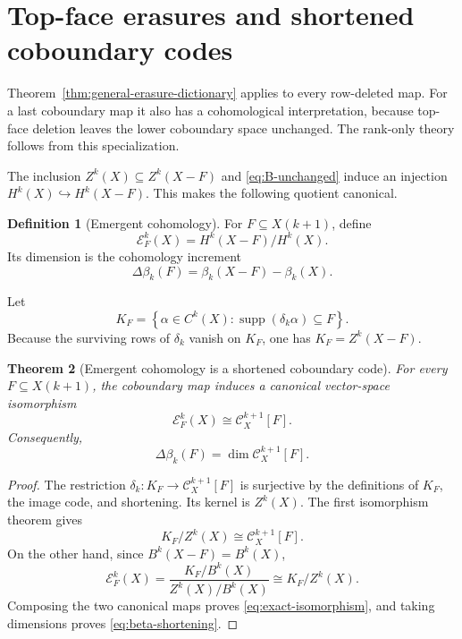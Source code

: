 \documentclass[11pt,letterpaper]{article}
\theoremstyle{plain}
\newtheorem{theorem}{Theorem}[section]
\theoremstyle{definition}
\newtheorem{definition}[theorem]{Definition}
\newcommand{\cC}{\mathcal{C}}
\newcommand{\cE}{\mathcal{E}}
\newcommand{\supp}{\operatorname{supp}}
\newcommand{\1}{\mathbf{1}}
\newcommand{\set}[1]{\left\{#1\right\}}
\begin{document}
\section{Top-face erasures and shortened coboundary codes}\label{sec:exact}

Theorem~\ref{thm:general-erasure-dictionary} applies to every row-deleted
map.  For a last coboundary map it also has a cohomological interpretation,
because top-face deletion leaves the lower coboundary space unchanged.  The
rank-only theory follows from this specialization.


The inclusion $Z^k(X)\subseteq Z^k(X-F)$ and
\eqref{eq:B-unchanged} induce an injection $H^k(X)\hookrightarrow H^k(X-F)$.
This makes the following quotient canonical.

\begin{definition}[Emergent cohomology]\label{def:emergent}
For $F\subseteq X(k+1)$, define
\[
 \cE_F^k(X)=H^k(X-F)/H^k(X).
\]
Its dimension is the cohomology increment
\[
 \Delta\beta_k(F)=\beta_k(X-F)-\beta_k(X).
\]
\end{definition}

Let
\[
 K_F=\set{\alpha\in C^k(X):\supp(\delta_k\alpha)\subseteq F}.
\]
Because the surviving rows of $\delta_k$ vanish on $K_F$, one has
$K_F=Z^k(X-F)$.

\begin{theorem}[Emergent cohomology is a shortened coboundary code]
\label{thm:exact-isomorphism}
For every $F\subseteq X(k+1)$, the coboundary map induces a canonical vector-space
isomorphism
\begin{equation}\label{eq:exact-isomorphism}
 \cE_F^k(X)\cong \cC_X^{k+1}[F].
\end{equation}
Consequently,
\begin{equation}\label{eq:beta-shortening}
 \Delta\beta_k(F)=\dim\cC_X^{k+1}[F].
\end{equation}
\end{theorem}

\begin{proof}
The restriction $\delta_k:K_F\to\cC_X^{k+1}[F]$ is surjective by the definitions of
$K_F$, the image code, and shortening.  Its kernel is $Z^k(X)$.  The first isomorphism theorem gives
\[
 K_F/Z^k(X)\cong \cC_X^{k+1}[F].
\]
On the other hand, since $B^k(X-F)=B^k(X)$,
\[
 \cE_F^k(X)
 =\frac{K_F/B^k(X)}{Z^k(X)/B^k(X)}
 \cong K_F/Z^k(X).
\]
Composing the two canonical maps proves \eqref{eq:exact-isomorphism}, and taking
dimensions proves \eqref{eq:beta-shortening}.
\end{proof}
\end{document}
